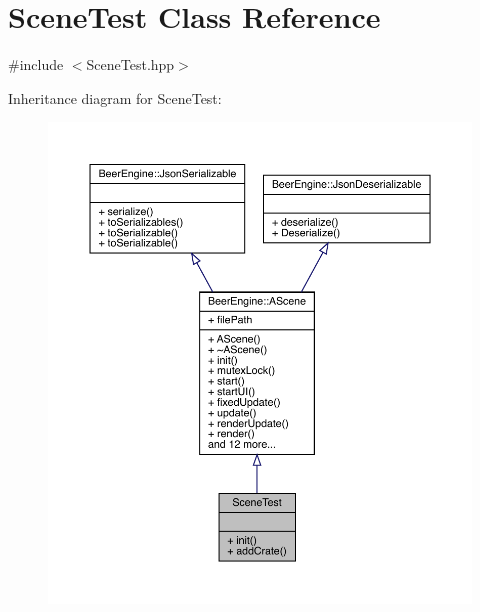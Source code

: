 \hypertarget{class_scene_test}{}\section{Scene\+Test Class Reference}
\label{class_scene_test}


{\ttfamily \#include $<$Scene\+Test.\+hpp$>$}



Inheritance diagram for Scene\+Test\+:\nopagebreak
\begin{figure}[H]
\begin{center}
\leavevmode
\includegraphics[width=350pt]{class_scene_test__inherit__graph}
\end{center}
\end{figure}


